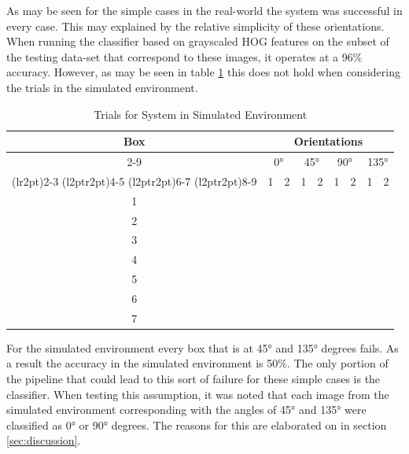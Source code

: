 \documentclass[letterpaper, 10 pt, conference]{conf/ieeeconf}  %
\newcommand{\cmark}{\ding{51}}%
\newcommand{\xmark}{\ding{55}}%
\begin{document}
As may be seen for the simple cases in the real-world the system was successful
in every case. This may explained by the relative simplicity of these
orientations. When running the classifier based on grayscaled HOG features on
the subset of the testing data-set that correspond to these images, it operates
at a 96\% accuracy. However, as may be seen in table \ref{tab:trials_simulated}
this does not hold when considering the trials in the simulated environment.

\begin{table}[H]
  \centering
  \begin{tabular}{c c c c c c c c c}
    \toprule
    \multirow{4}{*}[-0.5\dimexpr \aboverulesep + \belowrulesep + \cmidrulewidth]{Box} & \multicolumn{8}{c}{Orientations}\\
    \cmidrule(rl){2-9}
                                                                                      & \multicolumn{2}{c}{\ang{0}} & \multicolumn{2}{c}{\ang{45}} & \multicolumn{2}{c}{\ang{90}} & \multicolumn{2}{c}{\ang{135}} \\
    \cmidrule(lr{2pt}){2-3}
    \cmidrule(l{2pt}r{2pt}){4-5}
    \cmidrule(l{2pt}r{2pt}){6-7}
    \cmidrule(l{2pt}r{2pt}){8-9}
                                                                                      & 1      & 2      & 1      & 2      &  1     & 2      &  1     &  2    \\
    \midrule
    1 & \cmark & \cmark & \xmark & \xmark & \cmark & \cmark & \xmark & \xmark \\
    2 & \cmark & \cmark & \xmark & \xmark & \cmark & \cmark & \xmark & \xmark \\
    3 & \cmark & \cmark & \xmark & \xmark & \cmark & \cmark & \xmark & \xmark \\
    4 & \cmark & \cmark & \xmark & \xmark & \cmark & \cmark & \xmark & \xmark \\
    5 & \cmark & \cmark & \xmark & \xmark & \cmark & \cmark & \xmark & \xmark \\
    6 & \cmark & \cmark & \xmark & \xmark & \cmark & \cmark & \xmark & \xmark \\
    7 & \cmark & \cmark & \xmark & \xmark & \cmark & \cmark & \xmark & \xmark \\
    \bottomrule
  \end{tabular}
  \caption{Trials for System in Simulated Environment}
  \label{tab:trials_simulated}
\end{table}

For the simulated environment every box that is at \ang{45} and \ang{135}
degrees fails. As a result the accuracy in the simulated environment is 50\%.
The only portion of the pipeline that could lead to this sort of failure for
these simple cases is the classifier. When testing this assumption, it was noted
that each image from the simulated environment corresponding with the angles of
\ang{45} and \ang{135} were classified as \ang{0} or \ang{90} degrees. The
reasons for this are elaborated on in section \ref{sec:discussion}.
\end{document}
